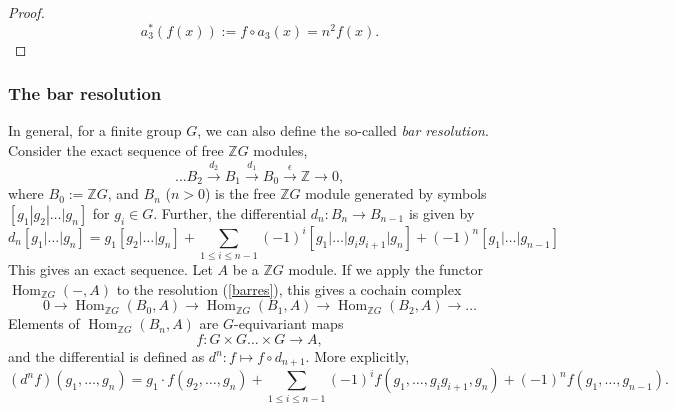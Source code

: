 \documentclass[a4paper, 10pt]{book}
\theoremstyle{definition}
\numberwithin{equation}{chapter}
\newcommand\Hom{\operatorname{Hom}}
\newcommand\ZZ{\mathbb Z}
\newcommand{\ra}\rightarrow
\newcommand{\xra}\xrightarrow
\begin{document}
\begin{appendices}
\begin{proof}
\begin{equation*}
	a_3^*(f(x)) := f\circ a_3(x) = n^2 f(x).
\end{equation*}

\end{proof}
\subsubsection{The bar resolution}
In general, for a finite group $G$, we can also define the so-called \textit{bar resolution}. Consider the exact sequence of free $\ZZ G$ modules, \begin{equation}
	\dots B_2 \xra{d_2} B_1\xra{d_1} B_0\xra{\epsilon}\ZZ \ra 0,\label{barres}
\end{equation} where $B_0 := \ZZ G$, and $B_n$ ($n>0$) is the free $\ZZ G$ module generated by symbols $[g_1| g_2 | \dots | g_n]$ for $g_i \in G$. Further, the differential $d_n:B_n\ra B_{n-1}$ is given by \begin{equation}\nonumber
	d_n[g_1|\dots | g_n] = g_1[g_2|\dots|g_n]+\sum_{1\leq i\leq n-1} (-1)^i[g_1|\dots|g_ig_{i+1}|g_n] + (-1)^n[g_1|\dots|g_{n-1}]
\end{equation}
This gives an exact sequence. Let $A$ be a $\ZZ G$ module. If we apply the functor $\Hom_{\ZZ G} (-, A)$ to the resolution (\ref{barres}), this gives a cochain complex  
\begin{equation}\nonumber
	0\ra\Hom_{\ZZ G}(B_0, A)\ra\Hom_{\ZZ G} (B_1, A)\ra \Hom_{\ZZ G}(B_2, A)\ra\dots
\end{equation}
Elements of $\Hom_{\ZZ G} (B_n, A)$ are $G$-equivariant maps \begin{equation}\nonumber
	f:G\times G \dots \times G \ra A,
\end{equation} and the differential is defined as $d^n: f\mapsto f\circ d_{n+1}$. More explicitly,
	\begin{equation}\nonumber
	(d^nf)(g_1,\dots , g_n) = g_1\cdot f(g_2,\dots,g_n)+\sum_{1\leq i\leq n-1} (-1)^if(g_1,\dots,g_ig_{i+1},g_n)  + (-1)^nf(g_1,\dots,g_{n-1}).
\end{equation}



\end{appendices}
\end{document}
